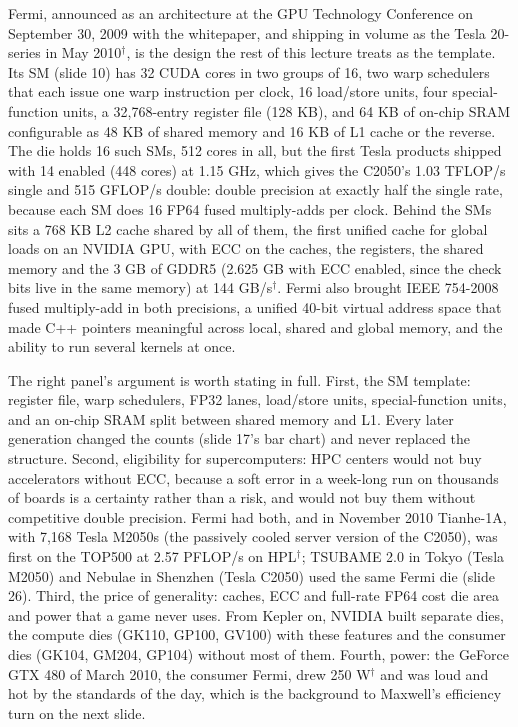 \documentclass[11pt,letterpaper]{article}
\begin{document}
Fermi, announced as an architecture at the GPU Technology Conference on September 30, 2009 with the whitepaper, and shipping in volume as the Tesla 20-series in May 2010$^\dagger$, is the design the rest of this lecture treats as the template. Its SM (slide 10) has 32 CUDA cores in two groups of 16, two warp schedulers that each issue one warp instruction per clock, 16 load/store units, four special-function units, a 32,768-entry register file (128 KB), and 64 KB of on-chip SRAM configurable as 48 KB of shared memory and 16 KB of L1 cache or the reverse. The die holds 16 such SMs, 512 cores in all, but the first Tesla products shipped with 14 enabled (448 cores) at 1.15 GHz, which gives the C2050's 1.03 TFLOP/s single and 515 GFLOP/s double: double precision at exactly half the single rate, because each SM does 16 FP64 fused multiply-adds per clock. Behind the SMs sits a 768 KB L2 cache shared by all of them, the first unified cache for global loads on an NVIDIA GPU, with ECC on the caches, the registers, the shared memory and the 3 GB of GDDR5 (2.625 GB with ECC enabled, since the check bits live in the same memory) at 144 GB/s$^\dagger$. Fermi also brought IEEE 754-2008 fused multiply-add in both precisions, a unified 40-bit virtual address space that made C++ pointers meaningful across local, shared and global memory, and the ability to run several kernels at once.

The right panel's argument is worth stating in full. First, the SM template: register file, warp schedulers, FP32 lanes, load/store units, special-function units, and an on-chip SRAM split between shared memory and L1. Every later generation changed the counts (slide 17's bar chart) and never replaced the structure. Second, eligibility for supercomputers: HPC centers would not buy accelerators without ECC, because a soft error in a week-long run on thousands of boards is a certainty rather than a risk, and would not buy them without competitive double precision. Fermi had both, and in November 2010 Tianhe-1A, with 7,168 Tesla M2050s (the passively cooled server version of the C2050), was first on the TOP500 at 2.57 PFLOP/s on HPL$^\dagger$; TSUBAME 2.0 in Tokyo (Tesla M2050) and Nebulae in Shenzhen (Tesla C2050) used the same Fermi die (slide 26). Third, the price of generality: caches, ECC and full-rate FP64 cost die area and power that a game never uses. From Kepler on, NVIDIA built separate dies, the compute dies (GK110, GP100, GV100) with these features and the consumer dies (GK104, GM204, GP104) without most of them. Fourth, power: the GeForce GTX 480 of March 2010, the consumer Fermi, drew 250 W$^\dagger$ and was loud and hot by the standards of the day, which is the background to Maxwell's efficiency turn on the next slide.
\end{document}
